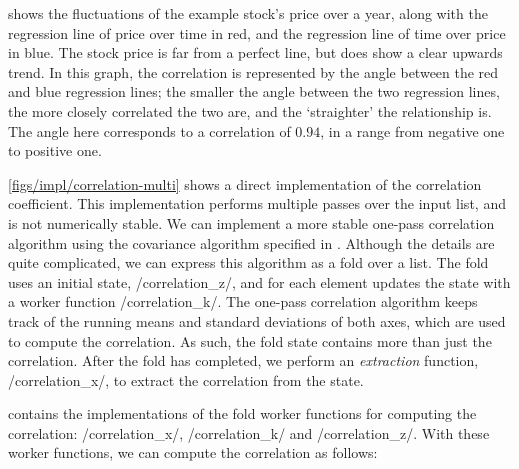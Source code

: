  shows the fluctuations of the example stock's price over a year, along with the regression line of price over time in red, and the regression line of time over price in blue.
The stock price is far from a perfect line, but does show a clear upwards trend.
In this graph, the correlation is represented by the angle between the red and blue regression lines; the smaller the angle between the two regression lines, the more closely correlated the two are, and the `straighter' the relationship is.
The angle here corresponds to a correlation of $0.94$, in a range from negative one to positive one.


\cref{figs/impl/correlation-multi} shows a direct implementation of the correlation coefficient.
This implementation performs multiple passes over the input list, and is not numerically stable.
We can implement a more stable one-pass correlation algorithm using the covariance algorithm specified in \citet{welford1962note}.
Although the details are quite complicated, we can express this algorithm as a fold over a list.
The fold uses an initial state, \Hs/correlation_z/, and for each element updates the state with a worker function \Hs/correlation_k/.
The one-pass correlation algorithm keeps track of the running means and standard deviations of both axes, which are used to compute the correlation.
As such, the fold state contains more than just the correlation.
After the fold has completed, we perform an \emph{extraction} function, \Hs/correlation_x/, to extract the correlation from the state.

 contains the implementations of the fold worker functions for computing the correlation: \Hs/correlation_x/, \Hs/correlation_k/ and \Hs/correlation_z/.
With these worker functions, we can compute the correlation as follows:

